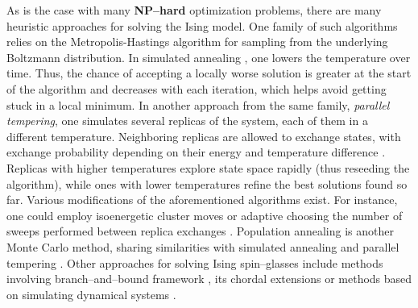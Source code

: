 As is the case with many \textbf{NP--hard} optimization problems, there are many heuristic
approaches for solving the Ising model. One family of such algorithms relies on the Metropolis-Hastings
\cite{beichl} algorithm for sampling from the underlying Boltzmann distribution. In simulated annealing
\cite{cook, isakov}, one lowers the temperature over time. Thus, the chance of accepting a locally
worse solution is greater at the start of the algorithm and decreases with each iteration, which
helps avoid getting stuck in a local minimum. In another approach from the same family,
\emph{parallel tempering}, one simulates several replicas of the system, each of them in a different
temperature. Neighboring replicas are allowed to exchange states, with exchange probability
depending on their energy and temperature difference \cite{swendsen}. Replicas with higher
temperatures explore state space rapidly (thus reseeding the algorithm), while ones with lower
temperatures refine the best solutions found so far. Various modifications of the aforementioned
algorithms exist. For instance, one could employ isoenergetic cluster moves \cite{zhu} or adaptive
choosing the number of sweeps performed between replica exchanges \cite{bittner}. Population
annealing is another Monte Carlo method, sharing similarities with simulated annealing and parallel
tempering \cite{wang}. Other approaches for solving Ising spin--glasses include methods involving
branch--and--bound framework \cite{rendl}, its chordal extensions \cite{baccari} or methods based on
simulating dynamical systems \cite{sheldon}.
